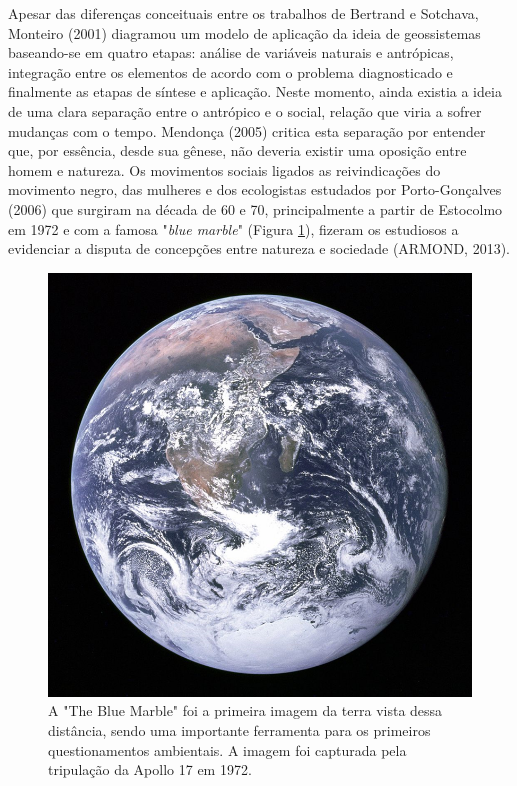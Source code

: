 Apesar das diferenças conceituais entre os trabalhos de Bertrand e Sotchava, Monteiro (2001)\cite{MONTEIRO_01} diagramou um modelo de aplicação da ideia de geossistemas baseando-se em quatro etapas: análise de variáveis naturais e antrópicas, integração entre os elementos de acordo com o problema diagnosticado e finalmente as etapas de síntese e aplicação. Neste momento, ainda existia a ideia de uma clara separação entre o antrópico e o social, relação que viria a sofrer mudanças com o tempo. Mendonça (2005)\cite{MENDONCA} critica esta separação por entender que, por essência, desde sua gênese, não deveria existir uma oposição entre homem e natureza. Os movimentos sociais ligados as reivindicações do movimento negro, das mulheres e dos ecologistas estudados por Porto-Gonçalves (2006)\cite{PORTO_GONCALVES} que surgiram na década de 60 e 70, principalmente a partir de Estocolmo em 1972 e com a famosa "\textit{blue marble}" (Figura \ref{fig:bluemarble}), fizeram os estudiosos a evidenciar a disputa de concepções entre natureza e sociedade (ARMOND, 2013)\cite{ARMOND}. 

	\begin{figure}
		\centering
		\includegraphics[width=0.9\linewidth]{data/blue_marble}
		\caption{A "The Blue Marble" foi a primeira imagem da terra vista dessa distância, sendo uma importante ferramenta para os primeiros questionamentos ambientais. A imagem foi capturada pela tripulação da Apollo 17 em 1972.}
		\label{fig:bluemarble}
	\end{figure}


